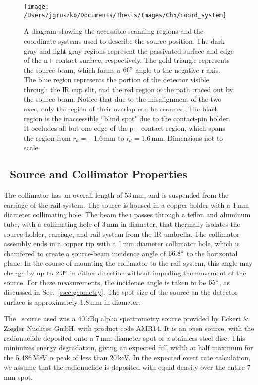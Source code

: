 \begin{figure}[]
 \texttt{[image: /Users/jgruszko/Documents/Thesis/Images/Ch5/coord\_system]}
 \caption[A diagram showing the accessible regions of the detector surface and the coordinate system used to describe the TUBE source positions]{A diagram showing the accessible scanning regions and the coordinate systems used to describe the source position. The dark gray and light gray regions represent the passivated surface and edge of the n+ contact surface, respectively. The gold triangle represents the source beam, which forms a $66\degree$ angle to the negative r axis. The blue region represents the portion of the detector visible through the IR cup slit, and the red region is the path traced out by the source beam. Notice that due to the misalignment of the two axes, only the region of their overlap can be scanned. The black region is the inaccessible ``blind spot" due to the contact-pin holder. It occludes all but one edge of the p+ contact region, which spans the region from $r_d = -1.6$\,mm to $r_d = 1.6$\,mm. Dimensions not to scale.} 
 \label{fig:scan_coords}
\end{figure}


\subsection{\am\ Source and Collimator Properties}

The collimator has an overall length of 53\,mm, and is suspended from the carriage of the rail system. The source is housed in a copper holder with a 1\,mm diameter collimating hole. The beam then passes through a teflon and aluminum tube, with a collimating hole of 3\,mm in diameter, that thermally isolates the source holder, carriage, and rail system from the IR umbrella. The collimator assembly ends in a copper tip with a 1\,mm diameter collimator hole, which is chamfered to create a source-beam incidence angle of $66.8\degree$ to the horizontal plane. In the course of mounting the collimator to the rail system, this angle may change by up to $2.3\degree$ in either direction without impeding the movement of the source. For these measurements, the incidence angle is taken to be $65\degree$, as discussed in Sec.~\ref{ssec:geometry}. The spot size of the source on the detector surface is approximately 1.8\,mm in diameter. 

The \am\ source used was a 40\,kBq alpha spectrometry source provided by Eckert \& Ziegler Nuclitec GmbH, with product code AMR14. It is an open source, with the radionuclide deposited onto a 7\,mm-diameter spot of a stainless steel disc. This minimizes energy degradation, giving an expected full width at half maximum for the 5.486\,MeV $\alpha$ peak of less than 20\,keV. In the expected event rate calculation, we assume that the radionuclide is deposited with equal density over the entire 7\,mm spot.

